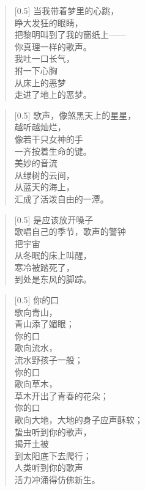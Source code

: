 \documentclass[12pt,UTF-8,openany]{ctexbook}
\begin{document}
\begin{large}
    
    \begin{verse}[0.5\linewidth]
        当我带着梦里的心跳， \\
        睁大发狂的眼睛， \\
        把黎明叫到了我的窗纸上—— \\
        你真理一样的歌声。 \\
        我吐一口长气， \\
        拊一下心胸 \\
        从床上的恶梦 \\
        走进了地上的恶梦。
    \end{verse}
    
    
    \begin{verse}[0.5\linewidth]
        歌声，像煞黑天上的星星， \\
        越听越灿烂， \\
        像若干只女神的手 \\
        一齐按着生命的键。 \\
        美妙的音流 \\
        从绿树的云间， \\
        从蓝天的海上， \\
        汇成了活泼自由的一潭。
    \end{verse}
    
    
    \begin{verse}[0.5\linewidth]
        是应该放开嗓子 \\
        歌唱自己的季节，歌声的警钟 \\
        把宇宙 \\
        从冬眠的床上叫醒， \\
        寒冷被踏死了， \\
        到处是东风的脚踪。
    \end{verse}
    
    
    \begin{verse}[0.5\linewidth]
        你的口 \\
        歌向青山， \\
        青山添了媚眼； \\
        你的口 \\
        歌向流水， \\
        流水野孩子一般； \\
        你的口 \\
        歌向草木， \\
        草木开出了青春的花朵； \\
        你的口 \\
        歌向大地，大地的身子应声酥软； \\
        蛰虫听到你的歌声， \\
        揭开土被 \\
        到太阳底下去爬行； \\
        人类听到你的歌声 \\
        活力冲涌得仿佛新生。
    \end{verse}
    

\end{large}
\end{document}
